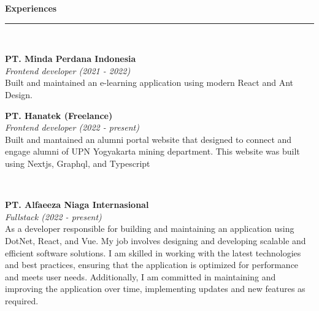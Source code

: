 \documentclass[11pt,oneside,a4paper,titlepage]{article}
\newcommand\skills[1]{
  \begin{tikzpicture}
    \foreach [count=\i] \x/\y in {#1}{
        \draw[fill=Red,Black] (0,\i+0.5) rectangle (6,\i+0.3);
        \draw[fill=Blue,Blue] (0,\i+0.5) rectangle (\y,\i+0.3);
        \draw[fill=White,White] (0,\i+0.11) rectangle (6,\i+0.3);
        \node[above left] at (0,\i+0.4) {\x};
    }
  \end{tikzpicture}
}
\newcommand{\sect}[2]{
  \begin{center}\color{Black}
    {\sffamily\Large\textbf{#1}}\\
    \rule{10em}{2pt} \\
    \vspace{0.5em}
    #2
  \end{center}
}
\newcommand{\sectitem}[2]{
  \begin{minipage}[c]{0.8\linewidth}
    \begin{center}
      {\textbf{#1}} \\
      \vspace{3pt}
      #2 \\
      \vspace{0.7em}
    \end{center}
  \end{minipage}
}
\newcommand{\experience}[4]{
  \begin{minipage}[c]{0.8\linewidth}
    \begin{center}
      {\textbf{#1}}\\
      \emph{#3 (#2)}\\
      \vspace{0.5em}
      \centering #4\\
      \vspace{1.5em}
    \end{center}
  \end{minipage}
}
\begin{document}



    \sect{Experiences}{
  \begin{adjmulticols}{2}{-2em}{-2em}
    \experience{PT. Minda Perdana Indonesia }{2021 - 2022}{Frontend developer}{
      Built and maintained an e-learning application using modern React and Ant Design.
    }
    \experience{PT. Hanatek (Freelance)}{2022 - present}{Frontend developer}{
        Built and mantained an alumni portal website that designed to connect and engage alumni of UPN Yogyakarta mining department. This website was built using Nextjs, Graphql, and Typescript    } \\
    \columnbreak
    \experience{PT. Alfaeeza Niaga Internasional }{2022 - present}{Fullstack}{
As a developer responsible for building and maintaining an application using DotNet, React, and Vue. My job involves designing and developing scalable and efficient software solutions. I am skilled in working with the latest technologies and best practices, ensuring that the application is optimized for performance and meets user needs. Additionally, I am committed in maintaining and improving the application over time, implementing updates and new features as required.    }

  \end{adjmulticols}
    }
\end{document}
